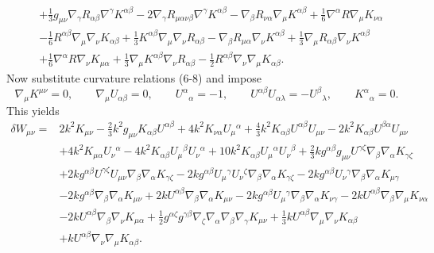 \documentclass[10pt,letterpaper]{article}
\begin{document}
\begin{align}
& + \tfrac{1}{3} g_{\mu \nu} \nabla_{\gamma}R_{\alpha \beta} \nabla^{\gamma}K^{\alpha \beta}
 - 2 \nabla_{\gamma}R_{\mu \alpha \nu \beta} \nabla^{\gamma}K^{\alpha \beta}
 -  \nabla_{\beta}R_{\nu \alpha} \nabla_{\mu}K^{\alpha \beta}
 + \tfrac{1}{6} \nabla^{\alpha}R \nabla_{\mu}K_{\nu \alpha}\nonumber\\
& -  \tfrac{1}{6} R^{\alpha \beta} \nabla_{\mu}\nabla_{\nu}K_{\alpha \beta}
 + \tfrac{1}{3} K^{\alpha \beta} \nabla_{\mu}\nabla_{\nu}R_{\alpha \beta}
 -  \nabla_{\beta}R_{\mu \alpha} \nabla_{\nu}K^{\alpha \beta}
 + \tfrac{1}{3} \nabla_{\mu}R_{\alpha \beta} \nabla_{\nu}K^{\alpha \beta}\nonumber\\
& + \tfrac{1}{6} \nabla^{\alpha}R \nabla_{\nu}K_{\mu \alpha}
 + \tfrac{1}{3} \nabla_{\mu}K^{\alpha \beta} \nabla_{\nu}R_{\alpha \beta}
 -  \tfrac{1}{2} R^{\alpha \beta} \nabla_{\nu}\nabla_{\mu}K_{\alpha \beta}.
\end{align}
Now substitute curvature relations (6-8) and impose
\begin{equation}
	\nabla_\mu K^{\mu\nu} = 0,\qquad \nabla_\mu U_{\alpha\beta} = 0,\qquad U^{\alpha}{}_{\alpha} = -1,\qquad U^{\alpha\beta}U_{\alpha\lambda}= -U^\beta{}_\lambda,\qquad K^\alpha{}_\alpha = 0.
\end{equation}
This yields
\begin{align}
\delta W_{\mu\nu}={}&2 k^2 K_{\mu \nu}
 -  \tfrac{2}{3} k^2 g_{\mu \nu} K_{\alpha \beta} U^{\alpha \beta}
 + 4 k^2 K_{\nu \alpha} U_{\mu}{}^{\alpha}
 + \tfrac{4}{3} k^2 K_{\alpha \beta} U^{\alpha \beta} U_{\mu \nu}
 - 2 k^2 K_{\alpha \beta} U^{\beta \alpha} U_{\mu \nu}\nonumber\\
& + 4 k^2 K_{\mu \alpha} U_{\nu}{}^{\alpha}
 - 4 k^2 K_{\alpha \beta} U_{\mu}{}^{\beta} U_{\nu}{}^{\alpha}
 + 10 k^2 K_{\alpha \beta} U_{\mu}{}^{\alpha} U_{\nu}{}^{\beta}
 + \tfrac{2}{3} k g^{\alpha \beta} g_{\mu \nu} U^{\gamma \zeta} \nabla_{\beta}\nabla_{\alpha}K_{\gamma \zeta}\nonumber\\
& + 2 k g^{\alpha \beta} U^{\gamma \zeta} U_{\mu \nu} \nabla_{\beta}\nabla_{\alpha}K_{\gamma \zeta}
 - 2 k g^{\alpha \beta} U_{\mu}{}^{\gamma} U_{\nu}{}^{\zeta} \nabla_{\beta}\nabla_{\alpha}K_{\gamma \zeta}
 - 2 k g^{\alpha \beta} U_{\nu}{}^{\gamma} \nabla_{\beta}\nabla_{\alpha}K_{\mu \gamma}\nonumber\\
& - 2 k g^{\alpha \beta} \nabla_{\beta}\nabla_{\alpha}K_{\mu \nu}
 + 2 k U^{\alpha \beta} \nabla_{\beta}\nabla_{\alpha}K_{\mu \nu}
 - 2 k g^{\alpha \beta} U_{\mu}{}^{\gamma} \nabla_{\beta}\nabla_{\alpha}K_{\nu \gamma}
 - 2 k U^{\alpha \beta} \nabla_{\beta}\nabla_{\mu}K_{\nu \alpha}\nonumber\\
& - 2 k U^{\alpha \beta} \nabla_{\beta}\nabla_{\nu}K_{\mu \alpha}
 + \tfrac{1}{2} g^{\alpha \zeta} g^{\gamma \beta} \nabla_{\zeta}\nabla_{\alpha}\nabla_{\beta}\nabla_{\gamma}K_{\mu \nu}
 + \tfrac{1}{3} k U^{\alpha \beta} \nabla_{\mu}\nabla_{\nu}K_{\alpha \beta}\nonumber\\
& + k U^{\alpha \beta} \nabla_{\nu}\nabla_{\mu}K_{\alpha \beta}.
\end{align}
\end{document}
